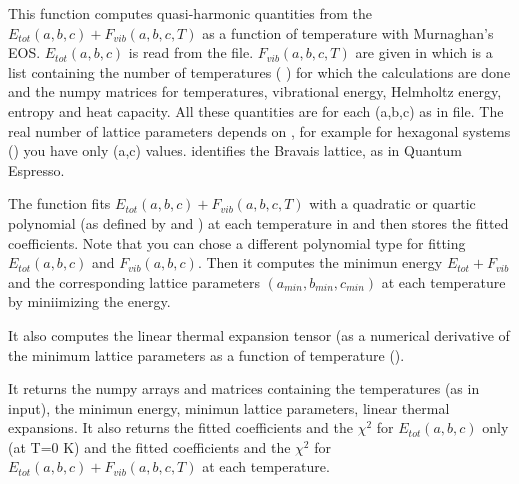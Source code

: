 \documentclass[letterpaper,10pt,english]{sphinxmanual}
\begin{document}
\label{pyqha:module-pyqha.fitFvib}

\begin{fulllineitems}
\label{pyqha:pyqha.fitFvib.fitFvib}
This function computes quasi-harmonic quantities from the 
\(E_{tot}(a,b,c)+F_{vib}(a,b,c,T)\) as a function of temperature with Murnaghan's
EOS. \(E_{tot}(a,b,c)\) is read from the  file. \(F_{vib}(a,b,c,T)\)
are given in  which is a list containing the number of temperatures
(  ) for which the calculations are done and the numpy matrices for 
temperatures, vibrational energy, Helmholtz energy, entropy and
heat capacity. All these quantities are for each (a,b,c) as in  file. The 
real number of lattice parameters depends on , for example for 
hexagonal systems () you have only (a,c) values.  identifies
the Bravais lattice, as in Quantum Espresso.

The function fits \(E_{tot}(a,b,c)+F_{vib}(a,b,c,T)\) with a quadratic
or quartic polynomial (as defined by  and  ) at each
temperature in  and then stores the fitted coefficients.    
Note that you can chose a different polynomial type for fitting \(E_{tot}(a,b,c)\)
and \(F_{vib}(a,b,c)\). Then it computes the minimun energy \(E_{tot}+F_{vib}\)
and the corresponding lattice parameters \((a_{min},b_{min},c_{min})\) 
at each temperature by miniimizing the energy.

It also computes the linear thermal expansion tensor (as a numerical derivative of
the minimum lattice parameters as a function of temperature ().

It returns the numpy arrays and matrices containing the temperatures (as in input), the
minimun energy, minimun lattice parameters, linear thermal expansions. It also
returns the fitted coefficients and the \(\chi^2\) for \(E_{tot}(a,b,c)\) 
only (at T=0 K) and the fitted coefficients and the \(\chi^2\) for 
\(E_{tot}(a,b,c)+F_{vib}(a,b,c,T)\) at each temperature.


\end{fulllineitems}
\end{document}
